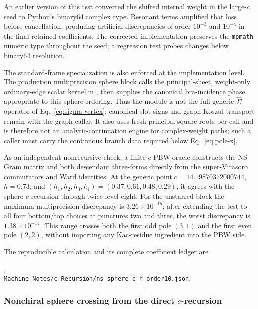 \documentclass[11pt]{article}
\begin{document}
An earlier version of this test converted the shifted internal weight in the
large-\(c\) seed to Python's binary64 complex type.  Resonant terms amplified
that loss before cancellation, producing artificial discrepancies of order
\(10^{-3}\) and \(10^{-4}\) in the final retained coefficients.  The corrected
implementation preserves the \texttt{mpmath} numeric type throughout the seed;
a regression test probes changes below binary64 resolution.

The standard-frame specialization is also enforced at the implementation
level.  The production multiprecision sphere block calls the principal-sheet,
weight-only ordinary-edge scalar kernel in
, then supplies the canonical bra-incidence
phase appropriate to this sphere ordering.  Thus the module is not the full
generic \(\widehat\Sigma\) operator of Eq.~\eqref{eq:sigma-vertex}: canonical
slot signs and graph Koszul transport remain with the graph caller.  It also
uses fresh principal square roots per call and is therefore not an
analytic-continuation engine for complex-weight paths; such a caller must
carry the continuous branch data required below Eq.~\eqref{eq:pole-x}.

As an independent nonrecursive check, a finite-\(c\) PBW oracle
constructs the NS Gram matrix and both descendant three-forms directly from
the super-Virasoro commutators and Ward identities.  At the generic point
\(c=14.19870372000744\), \(h=0.73\), and
\((h_1,h_2,h_3,h_4)=(0.37,0.61,0.48,0.29)\), it agrees with the sphere
\(c\)-recursion through twice-level eight.  For the unstarred block the
maximum multiprecision discrepancy is \(3.26\times10^{-15}\); after extending
the test to all four bottom/top choices at punctures two and three, the worst
discrepancy is \(1.38\times10^{-14}\).  This range crosses both the first odd
pole \((3,1)\) and the first even pole \((2,2)\), without importing any
Kac-residue ingredient into the PBW side.

The reproducible calculation and its complete coefficient ledger are
\begin{center}
 ,\\
 \texttt{Machine Notes/c-Recursion/ns\_sphere\_c\_h\_order10.json}.
\end{center}

\subsubsection{Nonchiral sphere crossing from the direct \texorpdfstring{\(c\)}{c}-recursion}
\label{sec:ns-sphere-direct-c-crossing}
\end{document}
